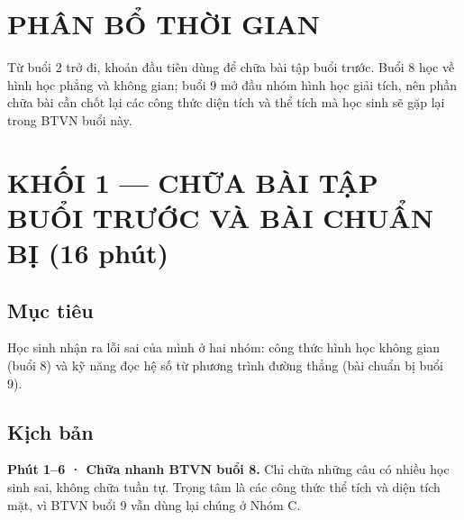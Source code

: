 \documentclass[11pt, a4paper]{article}
\begin{document}

\section{PHÂN BỔ THỜI GIAN}


Từ buổi 2 trở đi, khoản đầu tiên dùng để chữa bài tập buổi trước. Buổi 8 học về hình học phẳng và không gian; buổi 9 mở đầu nhóm hình học giải tích, nên phần chữa bài cần chốt lại các công thức diện tích và thể tích mà học sinh sẽ gặp lại trong BTVN buổi này.

\section{KHỐI 1 — CHỮA BÀI TẬP BUỔI TRƯỚC VÀ BÀI CHUẨN BỊ (16 phút)}

\subsection{Mục tiêu}

Học sinh nhận ra lỗi sai của mình ở hai nhóm: công thức hình học không gian (buổi 8) và kỹ năng đọc hệ số từ phương trình đường thẳng (bài chuẩn bị buổi 9).

\subsection{Kịch bản}

\textbf{Phút 1–6 · Chữa nhanh BTVN buổi 8.} Chỉ chữa những câu có nhiều học sinh sai, không chữa tuần tự. Trọng tâm là các công thức thể tích và diện tích mặt, vì BTVN buổi 9 vẫn dùng lại chúng ở Nhóm C.
\end{document}
